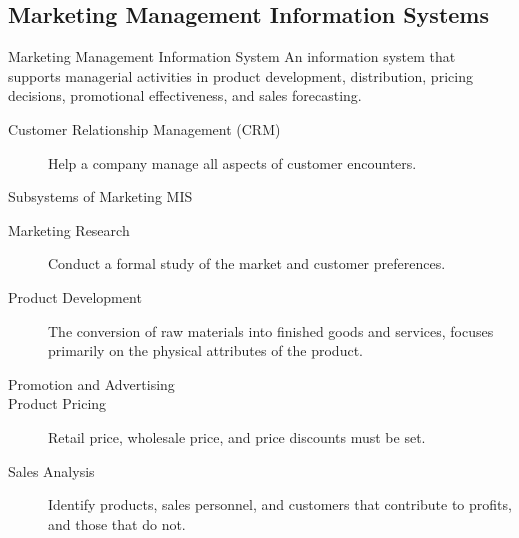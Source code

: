 \documentclass[\main/notes.tex]{subfiles}
\begin{document}
			\subsection{Marketing Management Information Systems}
				\begin{definition}{Marketing Management Information System}
					An information system that supports managerial activities in product development, distribution, pricing decisions, promotional effectiveness, and sales forecasting.
					\begin{description}
						\item[Customer Relationship Management (CRM)] Help a company manage all aspects of customer encounters. 
					\end{description}
				\end{definition}
				\pagebreak
				\begin{sidenote}{Subsystems of Marketing MIS}
					\begin{description}
						\item[Marketing Research] Conduct a formal study of the market and customer preferences.
						\item[Product Development] The conversion of raw materials into finished goods and services, focuses primarily on the physical attributes of the product.
						\item[Promotion and Advertising]
						\item[Product Pricing] Retail price, wholesale price, and price discounts must be set.
						\item[Sales Analysis] Identify products, sales personnel, and customers that contribute to profits, and those that do not.
					\end{description}
				\end{sidenote}
\end{document}
